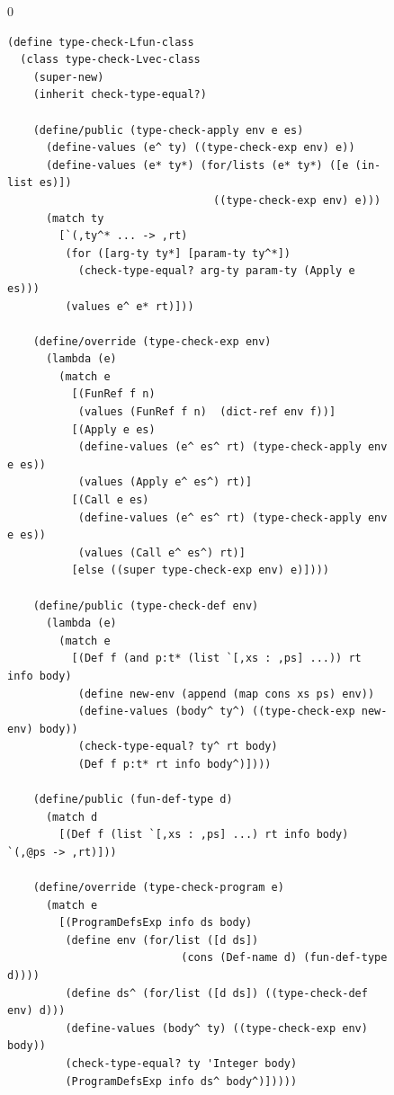 \documentclass[7x10]{TimesAPriori_MIT}%
\def\racketEd{0}
\def\edition{1}
\numberwithin{theorem}{chapter}
\numberwithin{definition}{chapter}
\numberwithin{equation}{chapter}
\begin{document}
\begin{figure}[tp]
  \begin{tcolorbox}[colback=white]
    {\if\edition\racketEd  
\begin{lstlisting}[basicstyle=\ttfamily\footnotesize]
(define type-check-Lfun-class
  (class type-check-Lvec-class
    (super-new)
    (inherit check-type-equal?)

    (define/public (type-check-apply env e es)
      (define-values (e^ ty) ((type-check-exp env) e))
      (define-values (e* ty*) (for/lists (e* ty*) ([e (in-list es)])
                                ((type-check-exp env) e)))
      (match ty
        [`(,ty^* ... -> ,rt)
         (for ([arg-ty ty*] [param-ty ty^*])
           (check-type-equal? arg-ty param-ty (Apply e es)))
         (values e^ e* rt)]))

    (define/override (type-check-exp env)
      (lambda (e)
        (match e
          [(FunRef f n)
           (values (FunRef f n)  (dict-ref env f))]
          [(Apply e es)
           (define-values (e^ es^ rt) (type-check-apply env e es))
           (values (Apply e^ es^) rt)]
          [(Call e es)
           (define-values (e^ es^ rt) (type-check-apply env e es))
           (values (Call e^ es^) rt)]
          [else ((super type-check-exp env) e)])))

    (define/public (type-check-def env)
      (lambda (e)
        (match e
          [(Def f (and p:t* (list `[,xs : ,ps] ...)) rt info body)
           (define new-env (append (map cons xs ps) env))
           (define-values (body^ ty^) ((type-check-exp new-env) body))
           (check-type-equal? ty^ rt body)
           (Def f p:t* rt info body^)])))	 

    (define/public (fun-def-type d)
      (match d
        [(Def f (list `[,xs : ,ps] ...) rt info body)  `(,@ps -> ,rt)]))

    (define/override (type-check-program e)
      (match e
        [(ProgramDefsExp info ds body)
         (define env (for/list ([d ds])
                           (cons (Def-name d) (fun-def-type d))))
         (define ds^ (for/list ([d ds]) ((type-check-def env) d)))
         (define-values (body^ ty) ((type-check-exp env) body))
         (check-type-equal? ty 'Integer body)
         (ProgramDefsExp info ds^ body^)]))))


\end{lstlisting}}
\end{tcolorbox}
\end{figure}
\end{document}
